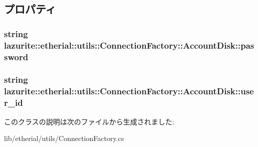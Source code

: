 \subsection{プロパティ}
\hypertarget{classlazurite_1_1etherial_1_1utils_1_1_connection_factory_1_1_account_disk_aa56d49c31498cf0a8daa3eecbc53318a}{
\subsubsection[{password}]{\setlength{\rightskip}{0pt plus 5cm}string lazurite::etherial::utils::ConnectionFactory::AccountDisk::password}}
\label{classlazurite_1_1etherial_1_1utils_1_1_connection_factory_1_1_account_disk_aa56d49c31498cf0a8daa3eecbc53318a}
\hypertarget{classlazurite_1_1etherial_1_1utils_1_1_connection_factory_1_1_account_disk_a987ae512da2808d3692666629e33a5ad}{
\subsubsection[{user\_\-id}]{\setlength{\rightskip}{0pt plus 5cm}string lazurite::etherial::utils::ConnectionFactory::AccountDisk::user\_\-id}}
\label{classlazurite_1_1etherial_1_1utils_1_1_connection_factory_1_1_account_disk_a987ae512da2808d3692666629e33a5ad}


このクラスの説明は次のファイルから生成されました:\begin{DoxyCompactItemize}
\item 
lib/etherial/utils/ConnectionFactory.cs\end{DoxyCompactItemize}
